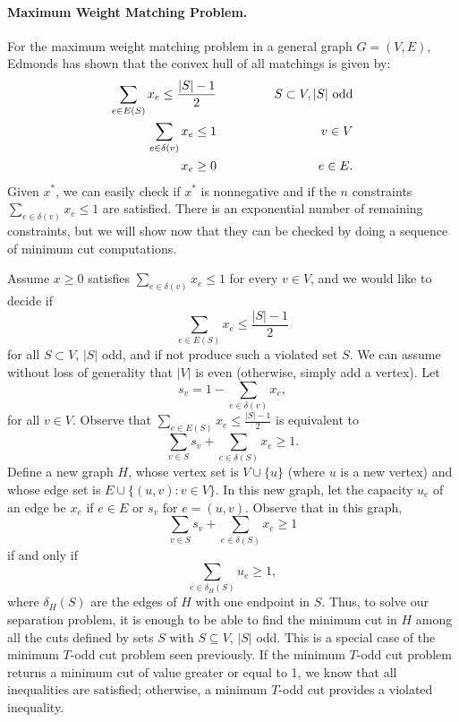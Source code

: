 \documentclass[12pt]{article}
\begin{document}
\paragraph{Maximum Weight Matching Problem.} 
For the maximum weight matching problem in a general graph $G=(V,E)$,
Edmonds has shown that the convex hull of all matchings is given by:
\begin{equation}
\begin{aligned}
\sum_{e\in E(S)} x_e \leq \frac{|S|-1}{2} & \hspace*{0.5in} &  S\subset V, |S| \mbox{
  odd} \\
\sum_{e\in \delta(v)} x_e \leq 1 & \hspace*{0.5in} & v\in V \\
x_e \geq 0 & \hspace*{0.5in} & e\in E.
\end{aligned}
\end{equation}
Given $x^*$, we can easily check if $x^*$ is nonnegative and if the
$n$ constraints $\sum_{e\in \delta(v)} x_e \leq 1$ are satisfied.
There is an exponential number of remaining constraints, but we will
show now that they can be checked by doing a sequence of minimum cut
computations.

Assume $x\geq 0$ satisfies $\sum_{e\in \delta(v)} x_e \leq 1$ for
every $v\in V$, and we would like to decide if $$\sum_{e\in E(S)} x_e
\leq \frac{|S|-1}{2}$$ for all $S\subset V$, $|S|$ odd, and if not
produce such a violated set $S$. We can assume without loss of
generality that $|V|$ is even (otherwise, simply add a vertex). 
Let $$s_v=1-\sum_{e\in \delta(v)}
x_e,$$ for all $v\in V$. Observe that $\sum_{e\in E(S)} x_e
\leq \frac{|S|-1}{2}$ is equivalent to $$\sum_{v\in S} s_v +
\sum_{e\in \delta(S)} x_e \geq 1.$$ Define a new graph $H$, whose
vertex set is $V\cup \{u\}$ (where $u$ is a new vertex) and whose edge
set is $E\cup \{(u,v):v\in V\}$. In this new graph, let the capacity
$u_e$ of an edge be $x_e$ if $e\in E$ or $s_v$ for $e=(u,v)$. Observe
that in this graph, $$\sum_{v\in S} s_v +
\sum_{e\in \delta(S)} x_e \geq 1$$ if and only if $$\sum_{e\in
  \delta_H(S)} u_e \geq 1,$$ where $\delta_H(S)$ are the edges of $H$
with one endpoint in $S$. Thus, to solve our separation problem, it is
enough to be able to find the minimum cut in $H$ among all the cuts
defined by sets $S$ with $S\subseteq V$, $|S|$ odd. This is a special
case of the minimum $T$-odd cut problem seen previously. If
the minimum $T$-odd cut problem returns a minimum cut of value greater
or equal to 1, we know that all inequalities are satisfied; otherwise,
a minimum $T$-odd cut provides a violated inequality. 
\end{document}
